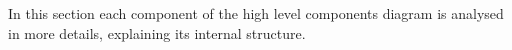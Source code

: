 In this section each component of the high level components diagram is analysed in more details, explaining
its internal structure.

